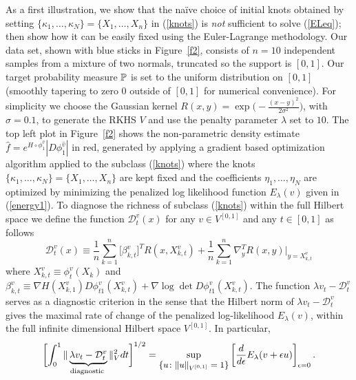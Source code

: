 \documentclass[noinfoline]{imsart}
\begin{document}
As a first illustration, we show that the na\"ive choice of initial knots obtained by setting $\{\kappa_1,\ldots, \kappa_N\}=\{ X_1,\ldots,X_n\}$ in (\ref{knots})  is {\em not} sufficient to solve  (\ref{ELeq}); then show how it can be easily fixed using the Euler-Lagrange methodology.
 Our data set, shown with blue sticks in Figure~\ref{f2}, consists of $n=10$ independent samples from a mixture of two normals, truncated so the support is $[0,1]$.  Our target probability measure $\Bbb P$ is set to the uniform distribution on  $[0,1]$ (smoothly tapering to zero $0$ outside of $[0,1]$ for numerical convenience).
  For simplicity we choose the Gaussian kernel $R(x,y)=\exp\bigl(-\frac{(x-y)^2}{2\sigma^2}\bigr)$, with $\sigma=0.1$, to generate the RKHS $V$ and use the  penalty parameter $\lambda$ set to $10$. The top left plot in Figure~\ref{f2} shows the non-parametric density estimate $\hat f= e^{ H\circ \phi^{\hat v}_1}  |D\phi_1^{\hat v}| $ in red, generated by applying a gradient based optimization algorithm applied to the subclass (\ref{knots}) where the knots $\{\kappa_1,\ldots, \kappa_N\}=\{X_1,\ldots, X_n\}$ are kept fixed and the coefficients $\eta_1,\ldots, \eta_N$ are optimized by minimizing the penalized log likelihood function $E_\lambda (v)$ given in (\ref{energy1}).
 To diagnose the richness of subclass (\ref{knots}) within the full Hilbert space we define the function $\mathcal D_t^v(x)$ for any $v\in V^{[0,1]}$ and any $t\in [0,1]$ as follows
 \begin{equation}
 \label{diag1}
 \mathcal D_t^v(x) \equiv    \frac{1}{ n}\sum_{k=1}^n \bigl[\beta_{k,t}^v\bigr]^T R(x, X_{k,t}^v )  +  \frac{1}{ n}\sum_{k=1}^n   \nabla_{y}^T R(x,y)\Bigr|_{y= X_{k,t}^v}
 \end{equation}
where $X_{k,t}^v\equiv \phi_t^{v} (X_k)$ and
$ \beta_{k,t}^v\equiv   \nabla H(X^v_{k,1}) D\phi^{v}_{t1}(X_{k,t}^v)  +\nabla \log\det D\phi^{ v}_{t1} (X^v_{k,t})$.
The function $\lambda v_t - \mathcal D_t^v$ serves as a diagnostic criterion in the sense that
  the Hilbert norm of $\lambda v_t - \mathcal D_t^v$ gives  the maximal rate of change of the penalized log-likelihood $E_\lambda(v)$, within the full infinite dimensional Hilbert space $V^{[0,1]}$. In particular,
 \[   \biggl[\int_0^1\|\underbrace{ \lambda v_t-\mathcal D_t^v}_\text{\scriptsize diagnostic } \|_{V}^2dt\biggr]^{1/2} = \sup_\text{\small $\{ u\colon \| u \|_{V^{[0,1]}}= 1 \}$} \left[\frac{d}{d\epsilon} E_\lambda (v+\epsilon u)\right]_{\epsilon = 0} .   \]
\end{document}
